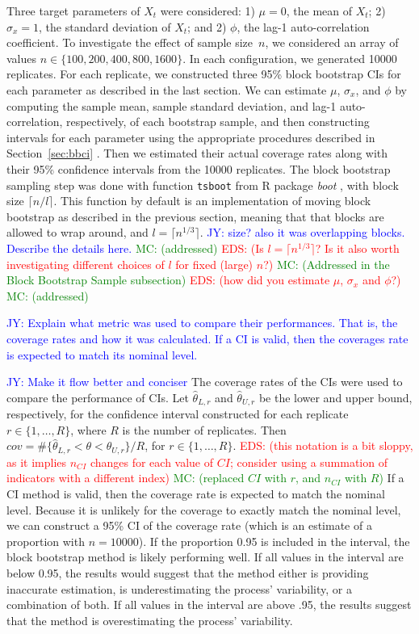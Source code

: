 \documentclass[12pt, letterpaper, titlepage]{article}
\newcommand{\jy}[1]{\textcolor{blue}{JY: #1}}
\newcommand{\eds}[1]{\textcolor{red}{EDS: (#1)}}
\newcommand{\mc}[1]{\textcolor{green}{MC: (#1)}}
\begin{document}
Three target parameters of $X_t$ were considered:
1) $\mu = 0$, the mean of $X_t$;
2) $\sigma_x = 1$, the standard deviation of $X_t$; and
2) $\phi$, the lag-1 auto-correlation coefficient.
To investigate the effect of sample size~$n$, we considered an array of values
$n \in \{100, 200, 400, 800, 1600\}$. In each configuration, we generated 10000
replicates. For each replicate, we constructed three 95\% block bootstrap
CIs for each parameter as described in the last section. We can estimate 
$\mu$, $\sigma_x$, and $\phi$ by computing the sample mean, sample 
standard deviation,
and lag-1 auto-correlation, respectively, of each bootstrap sample, and then 
constructing intervals for each parameter using the appropriate procedures
described in Section~\ref{sec:bbci} .
Then we estimated their actual coverage rates along with their 95\% confidence
intervals from the 10000 replicates. The block bootstrap sampling step was done
with function \texttt{tsboot} from R package \textsl{boot} \citep{boot}, with
block size $\lceil n / l \rceil$. This function by default is an implementation
of moving block bootstrap as described in the previous section, meaning that
that blocks are allowed to wrap around, and $l = \lceil n^{1/3} \rceil$.
\jy{size? also it was overlapping blocks. Describe the details here.}
\mc{addressed}
\eds{Is $l = \lceil n^{1/3} \rceil$? Is it also worth investigating different 
choices of $l$ for fixed (large) $n$?}
\mc{Addressed in the Block Bootstrap Sample subsection}
\eds{how did you estimate $\mu$, $\sigma_x$ and $\phi$?}
\mc{addressed}

\jy{Explain what metric was used to compare their performances. That is, the
  coverage rates and how it was calculated. If a CI is valid, then the coverages
  rate is expected to match its nominal level.}

\jy{Make it flow better and conciser}
The coverage rates of the CIs were used to compare the performance of CIs. Let
$\hat\theta_{L, r}$ and $\hat\theta_{U, r}$ be the lower and upper bound,
respectively, for the confidence interval constructed for each replicate
$r \in \{1, \ldots, R\}$, where $R$ is the
number of replicates.
Then $cov = \#\{\hat\theta_{L, r} < \theta < \hat\theta_{U, r} \}/R$,  
for $r \in \{1, \ldots, R\}$.
\eds{this notation is a bit sloppy, as it implies $n_{CI}$ changes for each 
value of $CI$; consider using a summation of indicators with a different index}
\mc{replaced $CI$ with $r$, and $n_{CI}$ with $R$}
If a CI method is valid, then the coverage rate is expected to match the
nominal 
level. Because it is unlikely for the coverage to exactly match the nominal
level,
we can construct a 95\% CI of the coverage
rate (which is an estimate of a proportion with $n = 10000$). If the proportion
0.95 is included in the interval, the block bootstrap method is likely
performing
well. If all values in the interval are below 0.95, the results would suggest 
that the
method either is providing inaccurate estimation, is underestimating the
process' variability, or a combination of both. If all values in the interval
are above .95, the results suggest that the method is overestimating the
process' variability.
\end{document}
